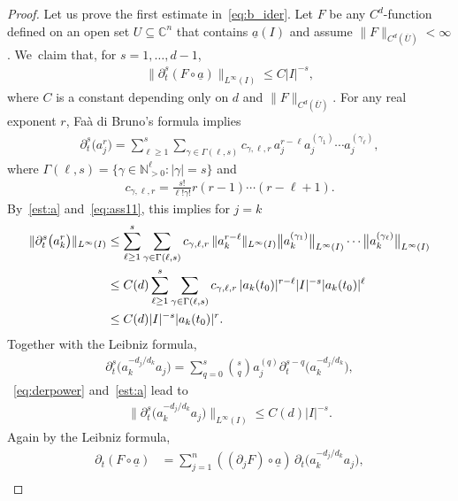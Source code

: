 \documentclass[pdftex]{sigma}
\numberwithin{equation}{section}
\def\ga{\gamma}
\def\Ga{\Gamma}
\def\C{\mathbb{C}}
\def\N{\mathbb{N}}
\def\p{\partial}
\def\ol{\overline}
\def\ul{\underline}
\renewcommand{\o}{\circ}
\begin{document}
\begin{proof}
 Let us prove the first estimate in~\eqref{eq:b_ider}.
 Let $F$ be any $C^d$-function defined on an open set $U\subseteq \C^{n}$ that contains
 $\underline a(I)$ and assume $\|F\|_{C^d(\ol U)} < \infty$. We~claim that, for $s = 1,\dots,d-1$,
 \begin{gather} \label{eq:B2}
 \|\p_t^s (F \o \ul a)\|_{L^\infty(I)} \le C |I|^{-s},
 \end{gather}
 where
 $C$ is a constant depending only on $d$ and $\|F\|_{C^d(\ol U)}$.
 For any real exponent $r$, Fa\`a di Bruno's formula implies
 \begin{gather} \label{FaadiBruno}
 \p_t^{s} \big(a_j^{r} \big) =
 \sum_{\ell \ge 1}^{s} \sum_{\ga \in \Ga(\ell,s)} c_{\ga,\ell,r}
 \, a_j^{r-\ell} a_j^{(\ga_1)} \cdots a_j^{(\ga_\ell)},
 \end{gather}
 where $\Ga(\ell,s) = \{\ga \in \N_{>0}^\ell \colon |\ga| = s\}$ and
 \begin{gather*}
 c_{\ga,\ell,r}= \frac{s!}{\ell! \ga!} r(r-1) \cdots (r-\ell+1).
 \end{gather*}
 By~\eqref{est:a} and~\eqref{eq:ass11}, this implies for $j=k$
 \begin{align}
 \|\p_t^{s} \big( a_k^{r} \big)\|_{L^\infty(I)}
 &\le
 \sum_{\ell \ge 1}^{s} \sum_{\ga \in \Ga(\ell,s)} c_{\ga,\ell,r}
 \, \|a_k^{r-\ell}\|_{L^\infty(I)} \big\|a_k^{(\ga_1)}\big\|_{L^\infty(I)}
 \cdots \big\|a_k^{(\ga_\ell)}\big\|_{L^\infty(I)}
 \notag \\
 &\le
 C(d) \sum_{\ell \ge 1}^{s} \sum_{\ga \in \Ga(\ell,s)} c_{\ga,\ell,r}
 \, |a_k(t_0)|^{r-\ell}
 |I|^{-s} |a_k(t_0)|^{\ell}
 \notag \\
 &\le
 C(d)
 |I|^{-s} |a_k(t_0)|^{r }.\label{eq:derpower}
 \end{align}
 Together with the Leibniz formula,
 \begin{gather*}
 \p_t^s \big( a_k^{- d_j/d_k} a_j\big)
 = \sum_{q=0}^{s} \binom{s}{q} a_j^{(q)} \p_t^{s-q} \big( a_k^{- d_j/d_k} \big),
 \end{gather*}
~\eqref{eq:derpower} and~\eqref{est:a} lead to
 \begin{gather} \label{eq:underlinea}
\big \|\p_t^s \big(a_k^{- d_j/d_k} a_j\big) \big\|_{L^\infty(I)}
 \le C(d) |I|^{-s}.
 \end{gather}
 Again by the Leibniz formula,
 \begin{align*}
 \p_t (F \o \ul a)
 &= \sum_{j=1}^n ((\p_{j} F)\o \ul a)\, \p_t \big( a_k^{- d_j/d_k} a_j\big),
 \\

\end{align*}
\end{proof}
\end{document}
